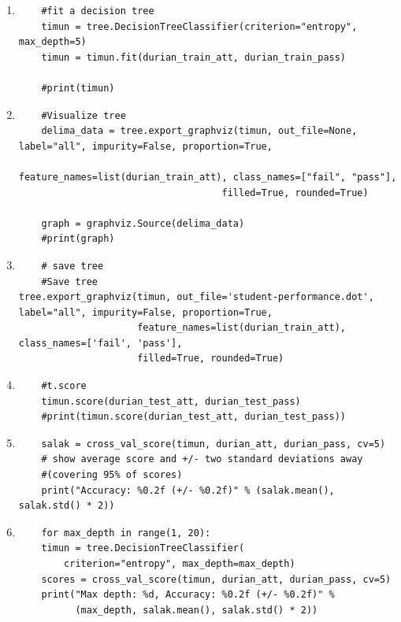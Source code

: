 \begin{enumerate}
\item 
\begin{verbatim}
	#fit a decision tree
	timun = tree.DecisionTreeClassifier(criterion="entropy", max_depth=5)
	timun = timun.fit(durian_train_att, durian_train_pass)

	#print(timun)
\end{verbatim}


\item
\begin{verbatim}
	#Visualize tree
	delima_data = tree.export_graphviz(timun, out_file=None, label="all", impurity=False, proportion=True,
									feature_names=list(durian_train_att), class_names=["fail", "pass"],
									filled=True, rounded=True)

	graph = graphviz.Source(delima_data)
	#print(graph)
\end{verbatim}


\item
\begin{verbatim}
	# save tree
	#Save tree
tree.export_graphviz(timun, out_file='student-performance.dot', label="all", impurity=False, proportion=True,
                     feature_names=list(durian_train_att), class_names=['fail', 'pass'],
                     filled=True, rounded=True)
\end{verbatim}


\item
\begin{verbatim}
	#t.score
	timun.score(durian_test_att, durian_test_pass)
	#print(timun.score(durian_test_att, durian_test_pass))
\end{verbatim}


\item
\begin{verbatim}
	salak = cross_val_score(timun, durian_att, durian_pass, cv=5)
	# show average score and +/- two standard deviations away 
	#(covering 95% of scores)
	print("Accuracy: %0.2f (+/- %0.2f)" % (salak.mean(), salak.std() * 2))
\end{verbatim}


\item 
\begin{verbatim}
	for max_depth in range(1, 20):
    timun = tree.DecisionTreeClassifier(
        criterion="entropy", max_depth=max_depth)
    scores = cross_val_score(timun, durian_att, durian_pass, cv=5)
    print("Max depth: %d, Accuracy: %0.2f (+/- %0.2f)" %
          (max_depth, salak.mean(), salak.std() * 2))
\end{verbatim}



\end{enumerate}
